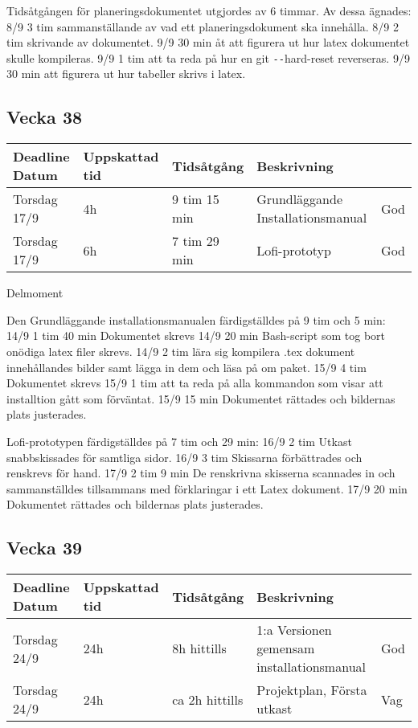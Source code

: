 \documentclass{TDP003mall}
\begin{document}
Tidsåtgången för planeringsdokumentet utgjordes av 6 timmar. Av dessa ägnades:
8/9 3 tim sammanställande av vad ett planeringsdokument ska innehålla.
8/9 2 tim skrivande av dokumentet.
9/9 30 min åt att figurera ut hur latex dokumentet skulle kompileras.
9/9 1 tim att ta reda på hur en git \texttt{-{}-}hard-reset reverseras.
9/9 30 min att figurera ut hur tabeller skrivs i latex.

\subsection{Vecka 38}
\begin{tabular}{|l|l|l|l|l|}
  \hline
  Deadline Datum & Uppskattad tid & Tidsåtgång & Beskrivning\\ [0.5ex]
  \hline
  Torsdag 17/9 & 4h & 9 tim 15 min & Grundläggande Installationsmanual & God\\
  \hline
  Torsdag 17/9 & 6h & 7 tim 29 min & Lofi-prototyp & God\\
  \hline
\end{tabular}

Delmoment

Den Grundläggande installationsmanualen färdigställdes på 9 tim och 5 min:
14/9 1 tim 40 min Dokumentet skrevs
14/9 20 min Bash-script som tog bort onödiga latex filer skrevs.
14/9 2 tim lära sig kompilera .tex dokument innehållandes bilder samt lägga in dem och läsa på om paket.
15/9 4 tim Dokumentet skrevs
15/9 1 tim att ta reda på alla kommandon som visar att installtion gått som förväntat.
15/9 15 min Dokumentet rättades och bildernas plats justerades.


Lofi-prototypen färdigställdes på 7 tim och 29 min:
16/9 2 tim Utkast snabbskissades för samtliga sidor.
16/9 3 tim Skissarna förbättrades och renskrevs för hand.
17/9 2 tim 9 min De renskrivna skisserna scannades in och sammanställdes tillsammans med förklaringar i ett Latex dokument.
17/9 20 min Dokumentet rättades och bildernas plats justerades.


\subsection{Vecka 39}
\begin{tabular}{|l|l|l|l|l|}
  \hline
  Deadline Datum & Uppskattad tid & Tidsåtgång & Beskrivning\\ [0.5ex]
  \hline
  Torsdag 24/9 & 24h & 8h hittills & 1:a Versionen gemensam installationsmanual & God\\
  \hline
  Torsdag 24/9 & 24h & ca 2h hittills & Projektplan, Första utkast & Vag\\
  \hline
\end{tabular}
\end{document}
